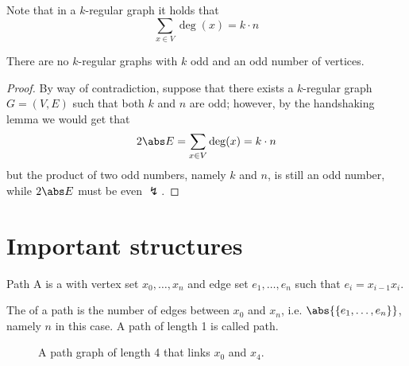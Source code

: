 \documentclass[a4paper, 12pt]{report}
\begin{document}
    Note that in a $k$-regular graph it holds that $$\sum_{x \in V}{\deg(x)} = k \cdot n$$

    \begin{framedprop}{}
        There are no $k$-regular graphs with $k$ odd and an odd number of vertices.
    \end{framedprop}
    
    \begin{proof}
        By way of contradiction, suppose that there exists a $k$-regular graph $G = (V, E)$ such that both $k$ and $n$ are odd; however, by the handshaking lemma we would get that $$2 \abs E = \sum_{x \in V} {\deg(x)} = k \cdot n$$ but the product of two odd numbers, namely $k$ and $n$, is still an odd number, while $2 \abs E$ must be even $\lightning$.
    \end{proof}

    \section{Important structures}

    \begin{frameddefn}{Path}
        A  is a  with vertex set $x_0, \ldots, x_n$ and edge set $e_1, \ldots, e_n$ such that $e_i = x_{i - 1}x_i$.

        The  of a path is the number of edges between $x_0$ and $x_n$, i.e. $\abs{\{e_1, \ldots, e_n\}}$, namely $n$ in this case. A path of length 1 is called  path.
    \end{frameddefn}

    \begin{figure}[H]
        \centering
        \caption{A path graph of length 4 that links $x_0$ and $x_4$.}
    \end{figure}
\end{document}
